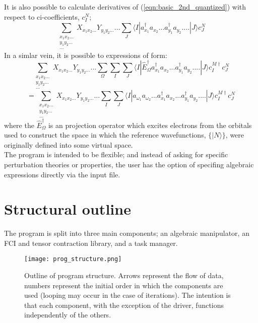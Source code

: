 \noindent It is also possible to calculate derivatives of (\ref{eqn:basic_2nd_quantized})  with respect to ci-coefficients, $c_{I}^{N}$;
\begin{equation}
\sum_{\substack{ x_{1}x_{2}...\\ y_{1}y_{2}... \\ ...}} X_{x_{1}x_{2}...} Y_{y_{1}y_{2}...} ...
\sum_{J}
\langle I | a^{\dagger}_{x_{1}} a_{x_{2}}...a^{\dagger}_{y_{1}}a_{y_{2}}....| J \rangle 
c^{N}_{J}
\label{eqn:ci_derivative}
\end{equation}
\noindent In a simlar vein, it is possible to expressions of form:
\begin{equation*}
\sum_{\substack{ x_{1}x_{2}...\\ y_{1}y_{2}... \\ ...}} X_{x_{1}x_{2}...} Y_{y_{1}y_{2}...} ...
\sum_{\Omega}
\sum_{I}\sum_{J}
\langle I | \hat{E}^{\dagger}_{\Omega} a^{\dagger}_{x_{1}} a_{x_{2}}...a^{\dagger}_{y_{1}}a_{y_{2}}....| J \rangle 
 c^{M \dagger}_{I}c^{N}_{J}
\end{equation*}
\begin{equation}
=
\sum_{\substack{ x_{1}x_{2}...\\ y_{1}y_{2}... \\ ...}} X_{x_{1}x_{2}...} Y_{y_{1}y_{2}...} ...
\sum_{I}\sum_{J}
\langle I | a_{\omega_{1}} a_{\omega_{2}}.. .a^{\dagger}_{x_{1}} a_{x_{2}}...a^{\dagger}_{y_{1}}a_{y_{2}}....| J \rangle 
 c^{M \dagger}_{I}c^{N}_{J}
\label{eqn:basic_2nd_quantized_projector}
\end{equation}
\noindent where the $\hat{E}^{\dagger}_{\Omega}$ is an projection operator
which excites electrons from the orbitals used to construct the space in which
the reference wavefunctions, $\{|N\rangle\}$, were originally defined into some
virtual space.\\

\noindent The program is intended to be flexible; and instead of asking for
specific perturbation theories or properties, the user has the option of
specifing algebraic expressions directly via the input file.

\section*{Structural outline}
\noindent The program is split into three main components; an algebraic manipulator, an FCI
and tensor contraction library, and a task manager.\\

\begin{figure}[!ht]
\begin{center}
\texttt{[image: prog\_structure.png]}
\caption{ Outline of program structure. Arrows represent the flow of data, numbers represent the
initial order in which the components are used (looping may occur in the case of iterations).
The intention is that each component, with the exception of the driver, functions independently of the others.}
\end{center}
\label{fig:prog_structure}
\end{figure}

